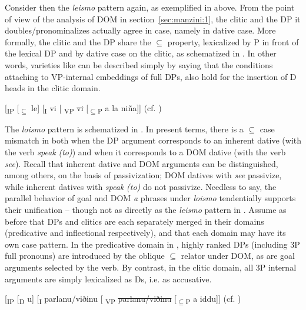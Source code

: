 \documentclass[output=paper,colorlinks,citecolor=brown]{./langscibook}
\begin{document}
Consider then the \textit{leismo} pattern again, as exemplified in  above. From the point of view of the analysis of DOM in section~\ref{sec:manzini:1}, the clitic and the DP it doubles/pronominalizes actually agree in case, namely in dative case. More formally, the clitic and the DP share the ${\subseteq}$ property, lexicalized by P in front of the lexical DP and by dative case on the clitic, as schematized in . In other words, varieties like  can be described simply by saying that the conditions attaching to VP-internal embeddings of full DPs, also hold for the insertion of D heads in the clitic domain.  

\ea%
    \label{ex:manzini:25}
    [\textsubscript{IP} [\textsubscript{${\subseteq}$} le]  [\textsubscript{I} vi   [\textsubscript{ VP} \sout{vi}  [\textsubscript{${\subseteq}$P} a la niña]]    \hfill (cf. )\\
\z

The \textit{loismo} pattern is schematized in . In present terms, there is a ${\subseteq}$ case mismatch in  both when the DP argument corresponds to an inherent dative (with the verb \textit{speak} \textit{(to)}) and when it corresponds to a DOM dative (with the verb \textit{see}). Recall that inherent dative and DOM arguments can be distinguished, among others, on the basis of passivization; DOM datives with \textit{see} passivize, while inherent datives with \textit{speak} \textit{(to)} do not passivize. Needless to say, the parallel behavior of goal and DOM \textit{a} phrases under \textit{loismo} tendentially supports their unification – though not as directly as the \textit{leismo} pattern in . Assume as before that DPs and clitics are each separately merged in their domains (predicative and inflectional respectively), and that each domain may have its own case pattern. In the predicative domain in , highly ranked DPs (including 3P full pronouns) are introduced by the oblique ${\subseteq}$ relator under DOM, as are goal arguments selected by the verb. By contrast, in the clitic domain, all 3P internal arguments are simply lexicalized as Ds, i.e. as accusative.

\ea%
    \label{ex:manzini:26}
    [\textsubscript{IP} [\textsubscript{D} u] [\textsubscript{I} parlanu/viðinu   [\textsubscript{ VP} \sout{parlanu/viðinu}  [\textsubscript{${\subseteq}$P} a iddu]]              \hfill (cf. )
\z
\end{document}
